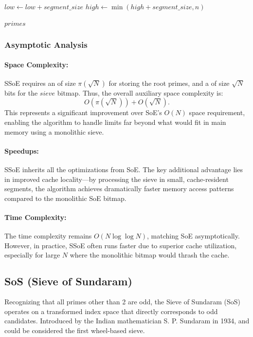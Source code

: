 \documentclass{article}
\begin{document}
\begin{algorithm}[H]
\begin{algorithmic}[1]
            \State $low \gets low + segment\_size$ 
            \State $high \gets \min(high + segment\_size, n)$
        \EndWhile

        \State \Return $primes$ 
    \end{algorithmic}
\end{algorithm}

\subsubsection*{Asymptotic Analysis}

\paragraph{Space Complexity:} SSoE requires an  of size $\pi(\sqrt{N})$ for storing the root primes, and a  of size $\sqrt{N}$ bits for the $sieve$ bitmap. Thus, the overall auxiliary space complexity is:
\[O(\pi(\sqrt{N})) + O(\sqrt{N}).\]
This represents a significant improvement over SoE's $O(N)$ space requirement, enabling the algorithm to handle limits far beyond what would fit in main memory using a monolithic sieve.

\paragraph{Speedups:}
SSoE inherits all the optimizations from SoE. The key additional advantage lies in improved cache locality—by processing the sieve in small, cache-resident segments, the algorithm achieves dramatically faster memory access patterns compared to the monolithic SoE bitmap. 

\paragraph{Time Complexity:} The time complexity remains $O(N \log \log N)$, matching SoE asymptotically. However, in practice, SSoE often runs faster due to superior cache utilization, especially for large $N$ where the monolithic bitmap would thrash the cache.

\subsection{SoS (Sieve of Sundaram)} \label{alg:sos}

Recognizing that all primes other than 2 are odd, the Sieve of Sundaram (SoS) operates on a transformed index space that directly corresponds to odd candidates.
Introduced by the Indian mathematician S. P. Sundaram in 1934, and could be considered the first wheel-based sieve.
\end{document}
